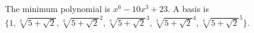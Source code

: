 \documentclass[12pt]{exam}
\begin{document}
\begin{questions}
\begin{parts}
\begin{solution}
The minimum polynomial is $x^6 - 10x^3 + 23$.  A basis is $\{1, \sqrt[3]{5+\sqrt{2}}, \sqrt[3]{5+\sqrt{2}}^2, \sqrt[3]{5+\sqrt{2}}^3, \sqrt[3]{5+\sqrt{2}}^4, \sqrt[3]{5+\sqrt{2}}^5\}$.
\end{solution}
\vfill
\end{parts} 

\end{questions}
\end{document}
